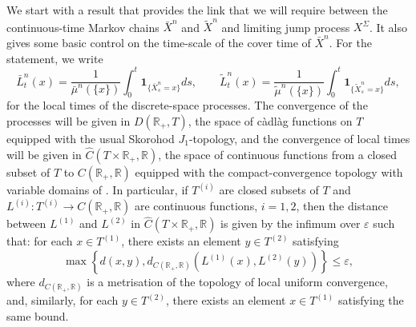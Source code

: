 \documentclass[a4paper, 11pt]{article}
\begin{document}
We start with a result that provides the link that we will require between the continuous-time Markov chains $\bar{X}^n$ and $\tilde{X}^n$ and limiting jump process $X^\Sigma$. It also gives some basic control on the time-scale of the cover time of $\bar{X}^n$. For the statement, we write
\[\bar{L}^n_{t}(x)=\frac{1}{\bar{\mu}^n(\{x\})}\int_{0}^t\mathbf{1}_{\{\bar{X}^n_s=x\}}ds,\qquad \tilde{L}^n_{t}(x)=\frac{1}{\tilde{\mu}^n(\{x\})}\int_{0}^t\mathbf{1}_{\{\tilde{X}^n_s=x\}}ds,\]
for the local times of the discrete-space processes. The convergence of the processes will be given in $D(\mathbb{R}_+,T)$, the space of c\`{a}dl\`{a}g functions on $T$ equipped with the usual Skorohod $J_1$-topology, and the convergence of local times will be given in $\hat{C}(T\times \mathbb{R}_+,\mathbb{R})$, the space of continuous functions from a closed subset of $T$ to $C(\mathbb{R}_+,\mathbb{R})$ equipped with the compact-convergence topology with variable domains of \cite[Definition 2.19]{Noda}. In particular, if $T^{(i)}$ are closed subsets of $T$ and $L^{(i)}:T^{(i)}\rightarrow C(\mathbb{R}_+,\mathbb{R})$ are continuous functions, $i=1,2$, then the distance between $L^{(1)}$ and $L^{(2)}$ in $\hat{C}(T\times \mathbb{R}_+,\mathbb{R})$ is given by the infimum over $\varepsilon$ such that: for each $x\in T^{(1)}$, there exists an element $y\in T^{(2)}$ satisfying
\begin{equation}\label{hatCdef}
\max\left\{d(x,y),d_{C(\mathbb{R}_+,\mathbb{R})}\left(L^{(1)}(x),L^{(2)}(y)\right)\right\}\leq \varepsilon,
\end{equation}
where $d_{C(\mathbb{R}_+,\mathbb{R})}$ is a metrisation of the topology of local uniform convergence, and, similarly, for each $y\in T^{(2)}$, there exists an element $x\in T^{(1)}$ satisfying the same bound.
\end{document}
